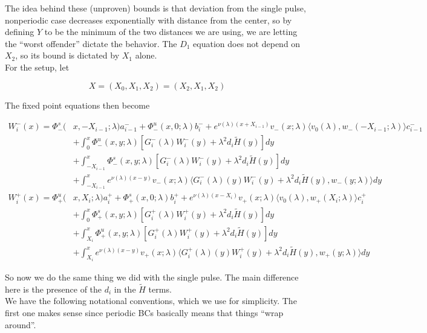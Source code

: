 \documentclass[12pt]{article}
\begin{document}
The idea behind these (unproven) bounds is that deviation from the single pulse, nonperiodic case decreases exponentially with distance from the center, so by defining $Y$ to be the minimum of the two distances we are using, we are letting the ``worst offender'' dictate the behavior. The $D_1$ equation does not depend on $X_2$, so its bound is dictated by $X_1$ alone.\\

For the setup, let

\[
X = (X_0, X_1, X_2) = (X_2, X_1, X_2)
\]

The fixed point equations then become

\begin{align*}
W_i^-(x) = \Phi^s_-(&x, -X_{i-1}; \lambda)a_{i-1}^- + \Phi^u_-(x, 0; \lambda)b_i^- + e^{\nu(\lambda)(x+X_{i-1})} v_-(x; \lambda) \langle v_0(\lambda), w_-(-X_{i-1}; \lambda) \rangle c_{i-1}^- \\
&+ \int_0^x \Phi^u_-(x, y; \lambda)[ G_i^-(\lambda)W_i^-(y) + \lambda^2 d_i \tilde{H}(y) ] dy \\
&+ \int_{-X_{i-1}}^x \Phi^s_-(x, y; \lambda) [ G_i^-(\lambda)W_i^-(y) + \lambda^2 d_i \tilde{H}(y) ] dy \\
&+ \int_{-X_{i-1}}^x 
e^{\nu(\lambda)(x-y)} v_-(x; \lambda) \langle G_i^-(\lambda)(y)W_i^-(y) + \lambda^2 d_i \tilde{H}(y), w_-(y; \lambda) \rangle dy	 \\
W_i^+(x) = \Phi^u_+(&x, X_i; \lambda)a_i^+ + \Phi^s_+(x, 0; \lambda)b_i^+ + e^{\nu(\lambda)(x - X_i)} v_+(x; \lambda) \langle v_0(\lambda), w_+(X_i; \lambda) \rangle c_i^+ \\
&+ \int_0^x \Phi^s_+(x, y; \lambda) [ G_i^+(\lambda)W_i^+(y) + \lambda^2 d_i \tilde{H}(y) ] dy \\
&+ \int_{X_i}^x \Phi^u_+(x, y; \lambda) [ G_i^+(\lambda)W_i^+(y) + \lambda^2 d_i \tilde{H}(y) ] dy \\
&+ \int_{X_i}^x e^{\nu(\lambda)(x-y)} v_+(x; \lambda) \langle G_i^+(\lambda)(y)W_i^+(y) + \lambda^2 d_i \tilde{H}(y), w_+(y; \lambda) \rangle dy
\end{align*}

So now we do the same thing we did with the single pulse. The main difference here is the presence of the $d_i$ in the $\tilde{H}$ terms. \\

We have the following notational conventions, which we use for simplicity. The first one makes sense since periodic BCs basically means that things ``wrap around''.
\end{document}
